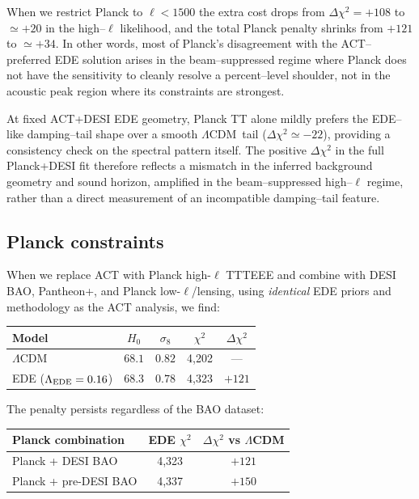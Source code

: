 \documentclass[twocolumn,showpacs,preprintnumbers,amsmath,amssymb,prd]{revtex4-2}
\newcommand{\lcdm}{$\Lambda$CDM}
\begin{document}
When we restrict Planck to $\ell < 1500$ the extra cost drops from
$\Delta\chi^2 = +108$ to $\simeq +20$ in the high--$\ell$ likelihood, and the
total Planck penalty shrinks from $+121$ to $\simeq +34$. In other words, most
of Planck's disagreement with the ACT--preferred EDE solution arises in the
beam--suppressed regime where Planck does not have the sensitivity to cleanly
resolve a percent--level shoulder, not in the acoustic peak region where its
constraints are strongest.

At fixed ACT+DESI EDE geometry, Planck TT alone mildly prefers the EDE--like
damping--tail shape over a smooth \lcdm\ tail ($\Delta\chi^2 \simeq -22$),
providing a consistency check on the spectral pattern itself. The positive
$\Delta\chi^2$ in the full Planck+DESI fit therefore reflects a mismatch in
the inferred background geometry and sound horizon, amplified in the
beam--suppressed high--$\ell$ regime, rather than a direct measurement of an
incompatible damping--tail feature.

\subsection{Planck constraints}

When we replace ACT with Planck high-$\ell$ TTTEEE and combine with DESI BAO, 
Pantheon+, and Planck low-$\ell$/lensing, using \emph{identical} EDE priors 
and methodology as the ACT analysis, we find:
\begin{center}
\begin{tabular}{lcccc}
\toprule
Model & $H_0$ & $\sigma_8$ & $\chi^2$ & $\Delta\chi^2$ \\
\midrule
\lcdm & $68.1$ & $0.82$ & 4,202 & --- \\
EDE ($\Lambda_{\rm EDE} = 0.16$) & $68.3$ & $0.78$ & 4,323 & $+121$ \\
\bottomrule
\end{tabular}
\end{center}

The penalty persists regardless of the BAO dataset:
\begin{center}
\begin{tabular}{lcc}
\toprule
Planck combination & EDE $\chi^2$ & $\Delta\chi^2$ vs \lcdm \\
\midrule
Planck + DESI BAO & 4,323 & $+121$ \\
Planck + pre-DESI BAO & 4,337 & $+150$ \\
\bottomrule
\end{tabular}
\end{center}
\end{document}
